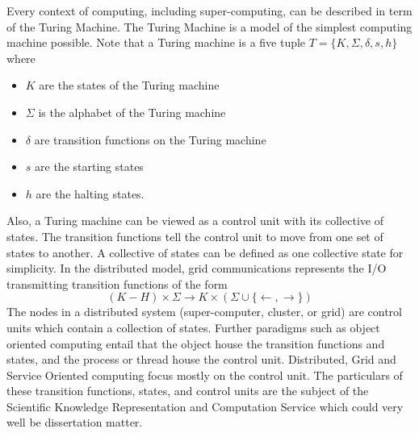 \documentclass[11pt]{article}
\begin{document}
\newpage
\begin{Large}
Every context of computing, including super-computing,  can be described in term of the Turing Machine.    The Turing Machine is a model of the simplest computing machine possible.   %
Note that a Turing machine is a five tuple $T= \{ K, \Sigma , \delta , s, h \}$ where 
\begin{itemize}
\item $K$ are the states of the Turing machine
\item $\Sigma$ is the alphabet of the Turing machine
\item $\delta$ are transition functions on the Turing machine
\item $s$ are the starting states
\item $h$ are the halting states.
\end{itemize}
Also, a Turing machine can be viewed as a control unit with its collective of states.  The transition functions tell the control unit to move from one set of states to another.  A collective of states can be defined as one collective state for simplicity.  In the distributed model,  grid communications represents the I/O transmitting transition functions of the form 
\[ (K - H) \times \Sigma \to K \times ( \Sigma  \cup \{ \leftarrow , \rightarrow  \} ) \]
The nodes in a distributed system (super-computer, cluster, or grid) are control units which contain a collection of states.  Further paradigms such as object oriented computing entail that the object house the transition functions and states, and the process or thread house the control unit.   Distributed, Grid and Service Oriented computing focus mostly on the control unit.    %
The particulars of these transition functions, states, and control units are the subject of the Scientific Knowledge Representation and Computation Service which could very well be dissertation matter.   
\end{Large}
\end{document}

